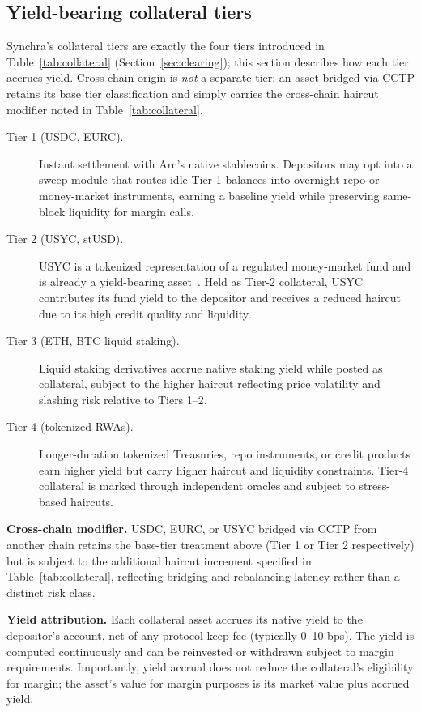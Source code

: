 \documentclass[11pt,a4paper]{article}
\begin{document}
\subsection{Yield-bearing collateral tiers}

Synchra's collateral tiers are exactly the four tiers introduced in Table~\ref{tab:collateral} (Section~\ref{sec:clearing}); this section describes how each tier accrues yield. Cross-chain origin is \emph{not} a separate tier: an asset bridged via CCTP retains its base tier classification and simply carries the cross-chain haircut modifier noted in Table~\ref{tab:collateral}.

\begin{description}
  \item[Tier 1 (USDC, EURC).] Instant settlement with Arc's native stablecoins. Depositors may opt into a sweep module that routes idle Tier-1 balances into overnight repo or money-market instruments, earning a baseline yield while preserving same-block liquidity for margin calls.
  \item[Tier 2 (USYC, stUSD).] USYC is a tokenized representation of a regulated money-market fund and is already a yield-bearing asset~\cite{usyc}. Held as Tier-2 collateral, USYC contributes its fund yield to the depositor and receives a reduced haircut due to its high credit quality and liquidity.
  \item[Tier 3 (ETH, BTC liquid staking).] Liquid staking derivatives accrue native staking yield while posted as collateral, subject to the higher haircut reflecting price volatility and slashing risk relative to Tiers 1--2.
  \item[Tier 4 (tokenized RWAs).] Longer-duration tokenized Treasuries, repo instruments, or credit products earn higher yield but carry higher haircut and liquidity constraints. Tier-4 collateral is marked through independent oracles and subject to stress-based haircuts.
\end{description}

\textbf{Cross-chain modifier.} USDC, EURC, or USYC bridged via CCTP from another chain retains the base-tier treatment above (Tier 1 or Tier 2 respectively) but is subject to the additional haircut increment specified in Table~\ref{tab:collateral}, reflecting bridging and rebalancing latency rather than a distinct risk class.

\textbf{Yield attribution.} Each collateral asset accrues its native yield to the depositor's account, net of any protocol keep fee (typically 0--10 bps). The yield is computed continuously and can be reinvested or withdrawn subject to margin requirements. Importantly, yield accrual does not reduce the collateral's eligibility for margin; the asset's value for margin purposes is its market value plus accrued yield.
\end{document}
